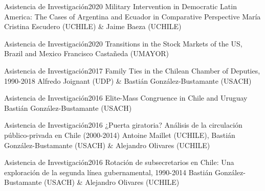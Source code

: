 





\begin{projects}
	\project
	{Asistencia de Investigación}{2020}
	{Military Intervention in Democratic Latin America: The Cases of Argentina and Ecuador in Comparative Perspective}
	{María Cristina Escudero (UCHILE) \& Jaime Baeza (UCHILE)}

	\project
	{Asistencia de Investigación}{2020}
	{Transitions in the Stock Markets of the US, Brazil and Mexico}
	{Francisco Castañeda (UMAYOR)}
	

	\project
	{Asistencia de Investigación}{2017}
	{Family Ties in the Chilean Chamber of Deputies, 1990-2018}
	{Alfredo Joignant (UDP) \& Bastián González-Bustamante (USACH)}

	\project
	{Asistencia de Investigación}{2016}
	{Elite-Mass Congruence in Chile and Uruguay}
	{Bastián González-Bustamante (USACH)}
	
	\project
	{Asistencia de Investigación}{2016}
	{¿Puerta giratoria? Análisis de la circulación público-privada en Chile (2000-2014)}
	{Antoine Maillet (UCHILE), Bastián González-Bustamante (USACH) \& Alejandro Olivares (UCHILE)}

	\project
	{Asistencia de Investigación}{2016}
	{Rotación de subsecretarios en Chile: Una exploración de la segunda línea gubernamental, 1990-2014}
	{Bastián González-Bustamante (USACH) \& Alejandro Olivares (UCHILE)}
	
\end{projects}
